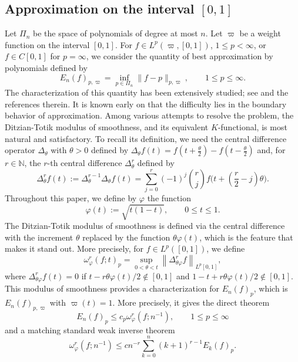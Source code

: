 \documentclass{amsart}
\theoremstyle{remark}
\def\t{{\theta}}
\def\NN{{\mathbb N}}
\def\t{{\theta}}
\def\NN{{\mathbb N}}
\def\f{\frac}
\def\f{\frac}
\begin{document}
\subsection{Approximation on the interval $[0,1]$} \label{sec:Approx[0,1]}
Let $\Pi_n$ be the space of polynomials of degree at most $n$. Let $\varpi$ be a weight function on the interval $[0,1]$.
For $f\in L^p(\varpi,[0,1])$, $1 \le p< \infty$, or $f\in C[0,1]$ for $p = \infty$, we consider the quantity of best approximation
by polynomials defined by 
$$
   E_n(f)_{p,\varpi} = \inf_{p \in \Pi_n} \|f - p\|_{p,\varpi}, \qquad 1 \le p \le \infty. 
$$
The characterization of this quantity has been extensively studied; see \cite{DL, DT} and the references therein. It is 
known early on that the difficulty lies in the boundary behavior of approximation. Among various attempts to resolve
the problem, the Ditzian-Totik modulus of smoothness, and its equivalent $K$-functional, is most natural and 
satisfactory. To recall its definition, we need the central difference operator $\Delta_\t$ with $\t> 0$ defined 
by $\Delta_\t f(t)=f\left(t+\f \t2\right)-f \left(t-\f \t2\right)$ and, for $r \in \NN$, the $r$-th central difference 
$\Delta_\t^r$ defined by
$$
   \Delta_{\t}^r f (t) :=  \Delta_{\t}^{r-1} \Delta_\t f (t)= \sum_{j=0}^r (-1)^j \binom{r}{j} f\Big(t+ \left(\frac{r}2 -j\right)\t  \Big).
$$ 
Throughout this paper, we define by $\varphi$ the function
$$
      \varphi(t):= \sqrt{t(1-t)}, \qquad 0 \le t \le 1. 
$$
The Ditzian-Totik modulus of smoothness is defined via the central difference with the increment $\t$ replaced 
by the function $\t \varphi(t)$, which is the feature that makes it stand out. More precisely, for $f\in L^p([0,1])$, we define
\begin{equation} \label{eq:DT-modulus}
  \omega_\varphi^r (f; t)_p = \sup_{0< \t < t} \left\| \Delta^r_{\t\varphi} f \right\|_{L^p[0,1]},
\end{equation} 
where $\Delta^r_{\t\varphi} f (t) = 0$ if $t - r \t \varphi(t)/2 \notin [0,1]$ and $1-t+ r\t \varphi(t)/2 \notin [0,1]$. 
This modulus of smoothness provides a characterization for $E_n(f)_{p}$, which is $E_n(f)_{p, \varpi}$ with $\varpi(t) =1$.
More precisely, it gives the direct theorem \cite[Theorem 7.2.1]{DT}
\begin{equation} \label{eq:direct[0,1]}
   E_n(f)_p \le c_p   \omega_\varphi^r \left(f;  n^{-1}\right), \qquad 1 \le p \le \infty
\end{equation} 
and a matching standard weak inverse theorem \cite[Theorem 7.2.4]{DT}
\begin{equation} \label{eq:inverse[0,1]}
     \omega_\varphi^r \left(f;  n^{-1}\right) \le c n^{-r} \sum_{k=0}^n (k+1)^{r-1} E_k(f)_p.
\end{equation} 
\end{document}
